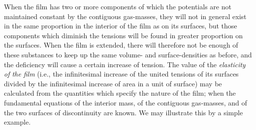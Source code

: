 \documentclass[12pt]{memoir}
\begin{document}
When the film has two or more components of which the potentials are not maintained constant by the contiguous gas-masses, they will not in general exist in the same proportion in the interior of the film as on its surfaces, but those components which diminish the tensions will be found in greater proportion on the surfaces. When the film is extended, there will therefore not be enough of these substances to keep up the same volume- and surface-densities as before, and the deficiency will cause a certain increase of tension. The value of the \textit{elasticity of the film} (i.e., the infinitesimal increase of the united tensions of its surfaces divided by the infinitesimal increase of area in a unit of surface) may be calculated from the quantities which specify the nature of the film; when the fundamental equations of the interior mass, of the contiguous gas-masses, and of the two surfaces of discontinuity are known. We may illustrate this by a simple example.
\end{document}
